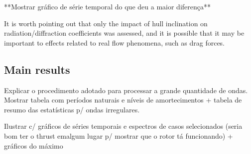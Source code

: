 **Mostrar gráfico de série temporal do que deu a maior diferença**

%

It is worth pointing out that only the impact of hull inclination on radiation/diffraction coefficients was assessed, and it is possible that it may be important to effects related to real flow phenomena, such as drag forces.






\subsection{Main results} \label{subsec:exp_vs_num:main_results}
Explicar o procedimento adotado para processar a grande quantidade de ondas.
Mostrar tabela com períodos naturais e níveis de amortecimentos + tabela de resumo das estatísticas p/ ondas irregulares.

Ilustrar c/ gráficos de séries temporais e espectros de casos selecionados (seria bom ter o thrust emalgum lugar p/ mostrar que o rotor tá funcionando) + gráficos do máximo


